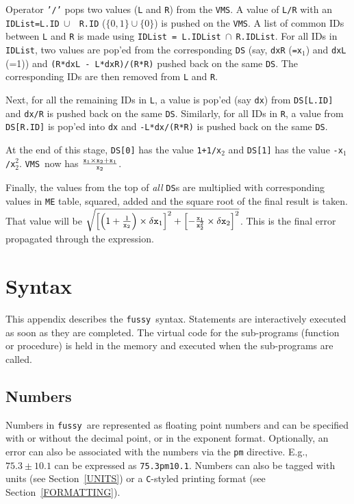 \documentclass[12pt]{article}
\newcommand{\Fussy}{{\tt fussy}}
\newcommand{\VMS}{{\tt VMS}}
\begin{document}
\begin{enumerate}
  Operator {\tt '/'} pops two values ({\tt L} and {\tt R}) from the
  \VMS.  A value of {\tt L/R} with an {\tt IDList=L.ID}$~\cup~${\tt
  R.ID} ($\{0,1\}\cup\{0\}$) is pushed on the \VMS.  A list of common
  IDs between {\tt L} and {\tt R} is made using {\tt IDList =
  L.IDList}$~\cap~${\tt R.IDList}.  For all IDs in {\tt IDList}, two
  values are pop'ed from the corresponding {\tt DS} (say, {\tt dxR}
  ({\tt =x$_1$}) and {\tt dxL} (=1)) and {\tt (R*dxL -
  L*dxR)/(R*R)} pushed back on the same {\tt DS}.  The corresponding
  IDs are then removed from {\tt L} and {\tt R}.
  
  Next, for all the remaining IDs in {\tt L}, a value is pop'ed (say
  {\tt dx}) from {\tt DS[L.ID]} and {\tt dx/R} is pushed back on the
  same {\tt DS}.  Similarly, for all IDs in {\tt R}, a value from {\tt
  DS[R.ID]} is pop'ed into {\tt dx} and {\tt -L*dx/(R*R)} is pushed
  back on the same {\tt DS}.
  
  At the end of this stage, {\tt DS[0]} has the value {\tt 1+1/x$_2$}
  and {\tt DS[1]} has the value {\tt -x$_1$/x$_2^2$}.  \VMS\ now has
  ${{\tt x}_1 \times {\tt x}_2 + {\tt x}_1 \over {\tt x}_2}$.
       
\end{enumerate}

Finally, the values from the top of {\it all} {\tt DS}s are multiplied
with corresponding values in {\tt ME} table, squared, added and the
square root of the final result is taken.  That value will be
$\sqrt{\left[\left(1+{1\over {\tt x}_2}\right) \times \delta {\tt
x}_1\right]^2+\left[-{{\tt x}_1 \over {\tt x}_2^2} \times \delta {\tt
x}_2\right]^2}$.  This is the final error propagated through the
expression.

\section{Syntax}
\label{APPEN:SYNTAX}

This appendix describes the \Fussy\ syntax.  Statements are
interactively executed as soon as they are completed.  The virtual
code for the sub-programs (function or procedure) is held in the
memory and executed when the sub-programs are called.

\subsection{Numbers}
\label{NUMBERS}
Numbers in \Fussy\ are represented as floating point numbers and can
be specified with or without the decimal point, or in the exponent
format.  Optionally, an error can also be associated with the numbers
via the {\tt pm} directive.  E.g., $75.3\pm 10.1$ can be expressed as
{\tt 75.3pm10.1}.  Numbers can also be tagged with units (see
Section~\ref{UNITS}) or a {\tt C}-styled printing format (see
Section~\ref{FORMATTING}).
\end{document}
